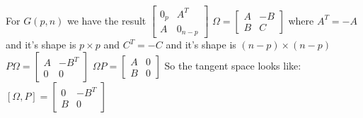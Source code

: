 \documentclass[11pt,a4paper]{report}
\begin{document}
For $G(p,n)$ we have the result $\begin{bmatrix} 0_p & A^T \\ A & 0_{n-p} \end{bmatrix}$
$\Omega = \begin{bmatrix} A & -B \\ B & C \end{bmatrix}$ where $A^T = -A$ and it's shape is $p \times p$ and $C^T = -C$ and it's shape is $(n-p) \times (n-p)$
$ P \Omega = \begin{bmatrix} A & - B^T \\ 0 & 0 \end{bmatrix} $
$ \Omega P = \begin{bmatrix} A & 0 \\ B & 0 \end{bmatrix}$
So the tangent space looks like:
$ [\Omega, P] = \begin{bmatrix} 0 & -B^T \\ B & 0 \end{bmatrix} $
\end{document}
